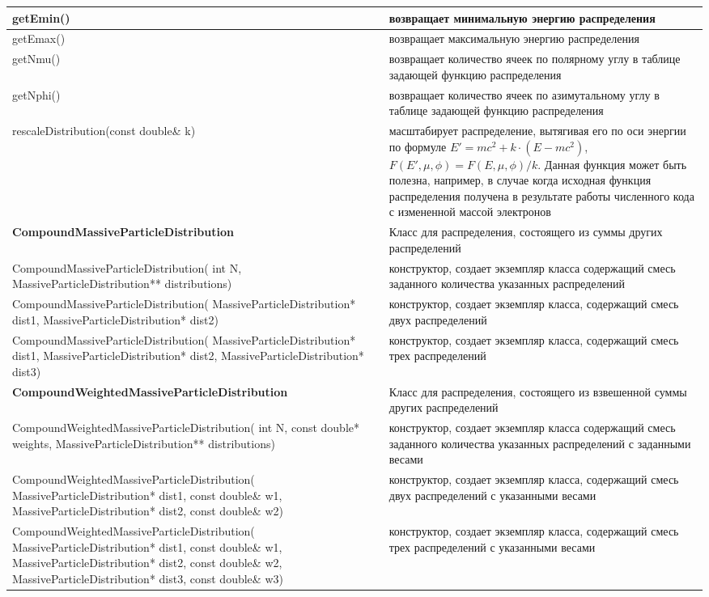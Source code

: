 \begin{small}
\begin{xtabular}{|p{0.52\textwidth}|p{0.48\textwidth}|}
		\hline
		getEmin() & возвращает минимальную энергию распределения\\
		\hline
		getEmax() & возвращает максимальную энергию распределения\\
		\hline
		getNmu() & возвращает количество ячеек по полярному углу в таблице задающей функцию распределения\\
		\hline
		getNphi() & возвращает количество ячеек по азимутальному углу в таблице задающей функцию распределения\\
		\hline
		rescaleDistribution(const double\& k) & масштабирует распределение, вытягивая его по оси энергии по формуле $E' = mc^2 + k\cdot(E-mc^2)$, $F(E',\mu, \phi)=F(E,\mu, \phi)/k$. Данная функция может быть полезна, например, в случае когда исходная функция распределения получена в результате работы численного кода с измененной массой электронов\\
		\hline
		\textbf{CompoundMassiveParticleDistribution} & Класс для распределения, состоящего из суммы других распределений\\
		\hline
		CompoundMassiveParticleDistribution( int N, MassiveParticleDistribution** distributions) & конструктор, создает экземпляр класса содержащий смесь заданного количества указанных распределений\\
		\hline
		CompoundMassiveParticleDistribution( MassiveParticleDistribution* dist1, MassiveParticleDistribution* dist2) & конструктор, создает экземпляр класса, содержащий смесь двух распределений \\
		\hline
		CompoundMassiveParticleDistribution( MassiveParticleDistribution* dist1, MassiveParticleDistribution* dist2, MassiveParticleDistribution* dist3) & конструктор, создает экземпляр класса, содержащий смесь трех распределений\\
		\hline
		\textbf{CompoundWeightedMassiveParticleDistribution} & Класс для распределения, состоящего из взвешенной суммы других распределений \\
		\hline
		CompoundWeightedMassiveParticleDistribution( int N, const double* weights, MassiveParticleDistribution** distributions) & конструктор, создает экземпляр класса содержащий смесь заданного количества указанных распределений с заданными весами \\
		\hline
		CompoundWeightedMassiveParticleDistribution( MassiveParticleDistribution* dist1, const double\& w1, MassiveParticleDistribution* dist2, const double\& w2) & конструктор, создает экземпляр класса, содержащий смесь двух распределений с указанными весами \\
		\hline
		CompoundWeightedMassiveParticleDistribution( MassiveParticleDistribution* dist1, const double\& w1, MassiveParticleDistribution* dist2, const double\& w2, MassiveParticleDistribution* dist3, const double\& w3) & конструктор, создает экземпляр класса, содержащий смесь трех распределений с указанными весами \\
		\hline
				
	\end{xtabular}
\end{small}

